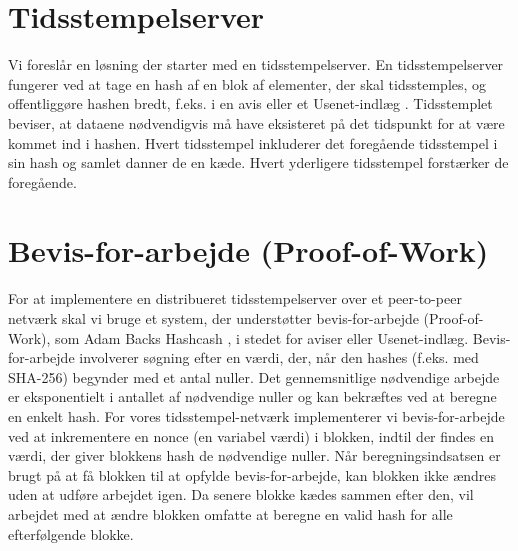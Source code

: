 \documentclass{article}
\begin{document}
\section{Tidsstempelserver}\label{sec:timestamp-server}
Vi foreslår en løsning der starter med en tidsstempelserver. En tidsstempelserver fungerer ved at tage en hash af en blok af elementer, der skal tidsstemples, og offentliggøre
hashen bredt, f.eks. i en avis eller et Usenet-indlæg \cite{massias1999design, haber1991time, bayer1993improving, haber1997secure}. Tidsstemplet beviser, at dataene nødvendigvis
må have eksisteret på det tidspunkt for at være kommet ind i hashen. Hvert tidsstempel inkluderer det foregående tidsstempel i sin hash og samlet danner de en kæde. Hvert
yderligere tidsstempel forstærker de foregående. \\

\vspace{1em}

\vspace{1em}

\section{Bevis-for-arbejde (Proof-of-Work)}\label{sec:proof-of-work}
For at implementere en distribueret tidsstempelserver over et peer-to-peer netværk skal vi bruge et system, der understøtter
bevis-for-arbejde (Proof-of-Work), som Adam Backs Hashcash \cite{back2002hashcash}, i stedet for aviser eller Usenet-indlæg. Bevis-for-arbejde involverer søgning efter en værdi, der, når den
hashes (f.eks. med SHA-256) begynder med et antal nuller. Det gennemsnitlige nødvendige arbejde er eksponentielt i antallet af nødvendige nuller og kan bekræftes ved at beregne
en enkelt hash. For vores tidsstempel-netværk implementerer vi bevis-for-arbejde ved at inkrementere en nonce (en variabel værdi) i blokken, indtil der findes en værdi, der
giver blokkens hash de nødvendige nuller. Når beregningsindsatsen er brugt på at få blokken til at opfylde bevis-for-arbejde, kan blokken ikke ændres uden at udføre arbejdet
igen. Da senere blokke kædes sammen efter den, vil arbejdet med at ændre blokken omfatte at beregne en valid hash for alle efterfølgende blokke. \\

\vspace{1em}

\vspace{1em}
\end{document}
